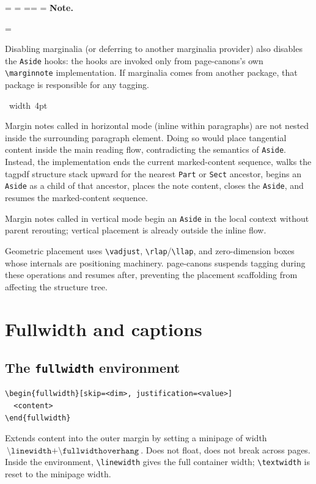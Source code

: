 \documentclass[11pt, twoside, openany]{book}
\makeatletter
\newcommand{\pkg}[1]{\textsf{#1}}
\newcommand{\cmd}[1]{\texttt{\textbackslash #1}}
\newcommand*{\cns@tag@artifact@begin}{}
\newcommand*{\cns@tag@artifact@end}{}
\newenvironment{TodoNote}[1][]{%
  \par\addvspace{0.5\baselineskip plus 2pt}%
  \setbox\cns@box=\vbox\bgroup
    \hsize=\linewidth
    \advance\hsize -10pt
    \linewidth=\hsize \columnwidth=\hsize
    \parindent=\z@
    \noindent\textbf{\sffamily Note\cns@ifnotempty{#1}{ \textmd{(#1)}}.}%
    \par\nobreak
    \@afterindentfalse\@afterheading
    \leftskip=\cns@indent\relax
    \ignorespaces
}{%
  \par
  \egroup
  \vbox{\hbox{%
    \cns@tag@artifact@begin\vrule width 4pt\cns@tag@artifact@end
    \hskip 6pt\relax
    \box\cns@box
  }}%
  \par\addvspace{0.5\baselineskip plus 2pt}%
}
\makeatother
\begin{document}
\begin{TodoNote}
    Disabling marginalia (or deferring to another marginalia provider) also disables the \texttt{Aside} hooks: the hooks are invoked only from \pkg{page-canons}'s own \cmd{marginnote} implementation. If marginalia comes from another package, that package is responsible for any tagging.
\end{TodoNote}

Margin notes called in horizontal mode (inline within paragraphs) are not nested inside the surrounding paragraph element. Doing so would place tangential content inside the main reading flow, contradicting the semantics of \texttt{Aside}. Instead, the implementation ends the current marked-content sequence, walks the \pkg{tagpdf} structure stack upward for the nearest \texttt{Part} or \texttt{Sect} ancestor, begins an \texttt{Aside} as a child of that ancestor, places the note content, closes the \texttt{Aside}, and resumes the marked-content sequence.

Margin notes called in vertical mode begin an \texttt{Aside} in the local context without parent rerouting; vertical placement is already outside the inline flow.

Geometric placement uses \cmd{vadjust}, \cmd{rlap}/\cmd{llap}, and zero-dimension boxes whose internals are positioning machinery. \pkg{page-canons} suspends tagging during these operations and resumes after, preventing the placement scaffolding from affecting the structure tree.




\chapter{Fullwidth and captions}\label{chapter:fullwidth}

\section{The \texttt{fullwidth} environment}\label{sec:fullwidth}

\begin{verbatim}
\begin{fullwidth}[skip=<dim>, justification=<value>]
  <content>
\end{fullwidth}
\end{verbatim}

Extends content into the outer margin by setting a minipage of width $\cmd{linewidth} + \cmd{fullwidthoverhang}$. Does not float, does not break across pages. Inside the environment, \cmd{linewidth} gives the full container width; \cmd{textwidth} is reset to the minipage width.
\end{document}
